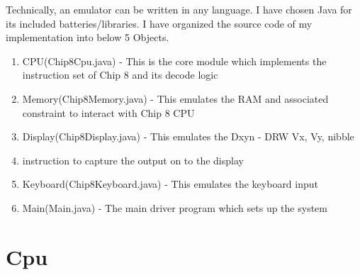 \documentclass{article}
\begin{document}
Technically, an emulator can be written in any language. I have chosen Java for its included batteries/libraries. I have organized the source code of my implementation into below 5 Objects.

\begin{enumerate}[noitemsep]
\item CPU(Chip8Cpu.java) - This is the core module which implements the instruction set of Chip 8 and its decode logic
\item Memory(Chip8Memory.java) - This emulates the RAM and associated constraint to interact with Chip 8 CPU
\item Display(Chip8Display.java) - This emulates the Dxyn - DRW Vx, Vy, nibble
\item instruction to capture the output on to the display
\item Keyboard(Chip8Keyboard.java) - This emulates the keyboard input
\item Main(Main.java) - The main driver program which sets up the system
\end{enumerate}
\section{Cpu}
\end{document}
